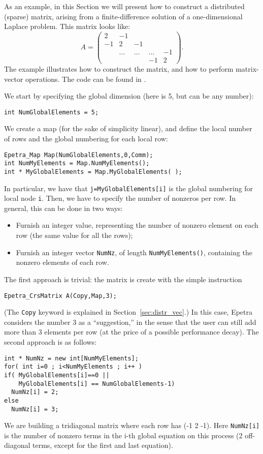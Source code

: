 As an example, in this Section we will present how to construct a
distributed (sparse) matrix, arising from a finite-difference solution
of a one-dimensional Laplace problem. This matrix looks like:
\begin{equation*}
A = \begin{pmatrix}
 2 & -1 &     &   &    \\
-1 &  2     & -1     &        &    \\
   & \ldots & \ldots & \ldots & -1 \\
   &        &        & -1     & 2
\end{pmatrix}.
\end{equation*}
The example illustrates how to construct the matrix,
and how to perform matrix-vector operations.
The code can be found in .

We start by specifying the global dimension (here is 5, but can be any
number):
\begin{verbatim}
int NumGlobalElements = 5;
\end{verbatim}
We create a map (for the sake of simplicity linear), and define the
local number of rows and the global numbering for each local row:
\begin{verbatim}
Epetra_Map Map(NumGlobalElements,0,Comm);
int NumMyElements = Map.NumMyElements();
int * MyGlobalElements = Map.MyGlobalElements( );
\end{verbatim}
In particular, we have that \verb!j=MyGlobalElements[i]! is the global
numbering for local node \verb!i!.  Then, we have to specify the number
of nonzeros per row. In general, this can be done in two ways:
\begin{itemize}
\item Furnish an integer value, representing the number of nonzero
  element on each row (the same value for all the rows);
\item Furnish an integer vector \verb!NumNz!, of length
  \verb!NumMyElements()!, containing the nonzero elements of each row.
\end{itemize}

The first approach is trivial: the matrix is create with the simple
instruction
\begin{verbatim}
Epetra_CrsMatrix A(Copy,Map,3);
\end{verbatim}
(The \verb!Copy! keyword is explained in Section~\ref{sec:distr_vec}.)
In this case, Epetra considers the number 3 as a ``suggestion,'' in the
sense that the user can still add more than 3 elements per row (at the
price of a possible performance decay).  The second approach is as
follows:
\begin{verbatim}
int * NumNz = new int[NumMyElements];
for( int i=0 ; i<NumMyElements ; i++ )
if( MyGlobalElements[i]==0 || 
    MyGlobalElements[i] == NumGlobalElements-1)
  NumNz[i] = 2;
else
  NumNz[i] = 3;
\end{verbatim}
We are building a tridiagonal matrix where each row has (-1 2 -1).  Here
\verb!NumNz[i]! is the number of nonzero terms in the i-th global
equation on this process (2 off-diagonal terms, except for the first and
last equation).

